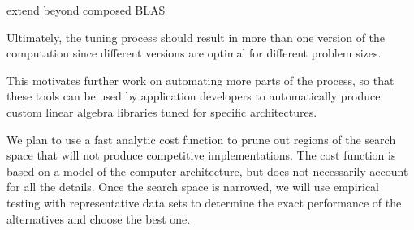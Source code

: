 \documentclass[11pt]{article}
\begin{document}
extend beyond composed BLAS

Ultimately, the tuning process should result in more than one version of the computation since different versions are optimal for different problem sizes.

This motivates further work on automating more parts of the process, so that these tools can be used by application developers to automatically produce custom linear algebra libraries tuned for specific architectures.

We plan to use a fast analytic cost function to prune out regions of the search space that will not produce competitive implementations. The cost function is based on a model of the computer architecture, but does not necessarily account for all the details.  Once the search space is narrowed, we will use empirical testing with representative data sets to determine the exact performance of the alternatives and choose the best one.

\singlespacing


\end{document}
